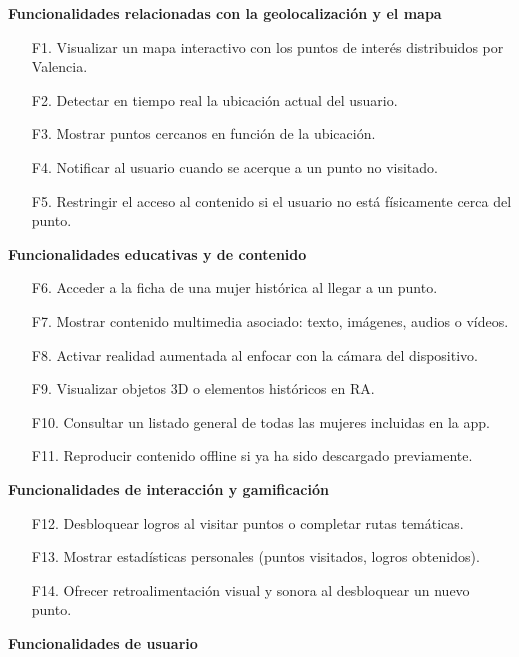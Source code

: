 \textbf{\textsf{\large Funcionalidades relacionadas con la geolocalización y el mapa}}

\begin{itemize}
    \item[F1.] Visualizar un mapa interactivo con los puntos de interés distribuidos por Valencia.
    \item[F2.] Detectar en tiempo real la ubicación actual del usuario.
    \item[F3.] Mostrar puntos cercanos en función de la ubicación.
    \item[F4.] Notificar al usuario cuando se acerque a un punto no visitado.
    \item[F5.] Restringir el acceso al contenido si el usuario no está físicamente cerca del punto.
\end{itemize}

\textbf{\textsf{\large Funcionalidades educativas y de contenido}}

\begin{itemize}
    \item[F6.] Acceder a la ficha de una mujer histórica al llegar a un punto.
    \item[F7.] Mostrar contenido multimedia asociado: texto, imágenes, audios o vídeos.
    \item[F8.] Activar realidad aumentada al enfocar con la cámara del dispositivo.
    \item[F9.] Visualizar objetos 3D o elementos históricos en RA.
    \item[F10.] Consultar un listado general de todas las mujeres incluidas en la app.
    \item[F11.] Reproducir contenido offline si ya ha sido descargado previamente.
\end{itemize}

\textbf{\textsf{\large Funcionalidades de interacción y gamificación}}

\begin{itemize}
    \item[F12.] Desbloquear logros al visitar puntos o completar rutas temáticas.
    \item[F13.] Mostrar estadísticas personales (puntos visitados, logros obtenidos).
    \item[F14.] Ofrecer retroalimentación visual y sonora al desbloquear un nuevo punto.
\end{itemize}

\textbf{\textsf{\large Funcionalidades de usuario}}

